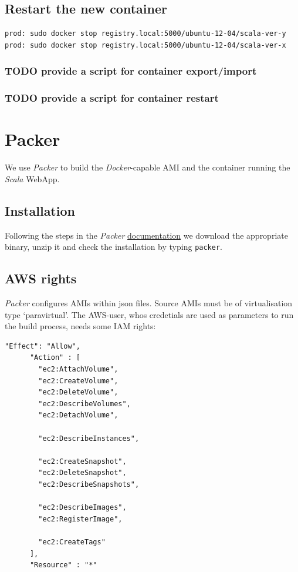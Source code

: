 \documentclass[captions=tableheading]{article}
\begin{document}
\subsection{Restart the new container}
\label{sec-6-4}


\begin{verbatim}
prod: sudo docker stop registry.local:5000/ubuntu-12-04/scala-ver-y
prod: sudo docker stop registry.local:5000/ubuntu-12-04/scala-ver-x
\end{verbatim}
\subsubsection{\textbf{TODO} provide a script for container export/import}
\label{sec-6-4-1}
\subsubsection{\textbf{TODO} provide a script for container restart}
\label{sec-6-4-2}
\section{Packer}
\label{sec-7}

We use \emph{Packer} to build the \emph{Docker}-capable AMI and the container running the \emph{Scala} WebApp.
\subsection{Installation}
\label{sec-7-1}

Following the steps in the \emph{Packer}  \href{http://www.packer.io/intro/getting-started/setup.html}{documentation} we download the appropriate binary, unzip it and check the installation by typing \texttt{packer}.
\subsection{AWS rights}
\label{sec-7-2}

\emph{Packer} configures AMIs within json files. Source AMIs must be of virtualisation type `paravirtual'.  The AWS-user, whos credetials are used as parameters to run the build process, needs some IAM rights:

\begin{verbatim}
"Effect": "Allow",
      "Action" : [
        "ec2:AttachVolume",
        "ec2:CreateVolume",
        "ec2:DeleteVolume",
        "ec2:DescribeVolumes",
        "ec2:DetachVolume",

        "ec2:DescribeInstances",

        "ec2:CreateSnapshot",
        "ec2:DeleteSnapshot",
        "ec2:DescribeSnapshots",

        "ec2:DescribeImages",
        "ec2:RegisterImage",

        "ec2:CreateTags"
      ],
      "Resource" : "*"
\end{verbatim}
\end{document}
